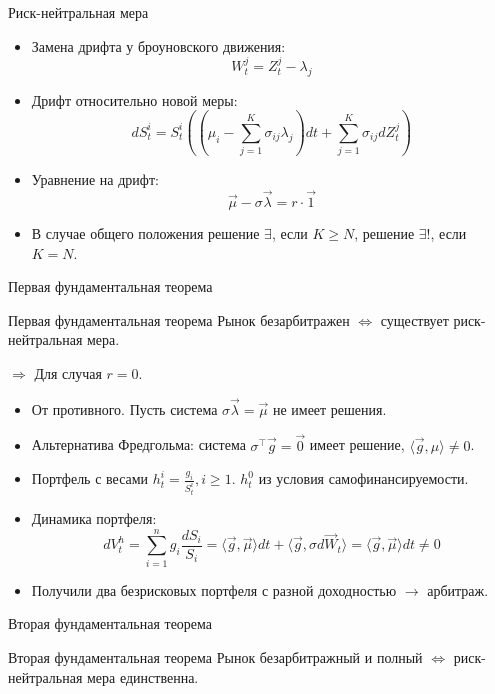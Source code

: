 \documentclass[aspectratio=169]{beamer}
\begin{document}
\begin{frame}{Риск-нейтральная мера}
    \begin{itemize}
        \item Замена дрифта у броуновского движения:
        $$
            W_t^j = Z_t^j - \lambda_j
        $$
        \item Дрифт относительно новой меры:
        $$
            dS^i_t = S^i_t \left( (\mu_i - \sum_{j=1}^K \sigma_{ij} \lambda_j) dt  + \sum_{j=1}^K \sigma_{ij} dZ_t^j \right)
        $$
        \item Уравнение на дрифт:
        $$
            \vec{\mu} - \sigma \vec{\lambda} = r \cdot \vec{1}
        $$
        \item В случае общего положения решение $\exists$, если $K \geq N$, решение $\exists!$, если $K=N$.
    \end{itemize}
\end{frame}

\begin{frame}{Первая фундаментальная теорема}
    \begin{block}{Первая фундаментальная теорема}
        Рынок безарбитражен $\Leftrightarrow$ существует риск-нейтральная мера.
    \end{block}

    $\Rightarrow$ Для случая $r=0$.
    \begin{itemize}
        \item От противного. Пусть система $\sigma \vec{\lambda} = \vec{\mu}$ не имеет решения.
        \item Альтернатива Фредгольма: система $\sigma^{\top} \vec{g} = \vec{0}$ имеет решение, $\langle \vec{g}, \mu \rangle \neq 0$.
        \item Портфель с весами $h_t^i = \frac{g_i}{S_t^i}, i \geq 1$. $h_t^0$ из условия самофинансируемости.
        \item Динамика портфеля:
        $$
            dV^h_t = \sum_{i=1}^n g_i \frac{dS_i}{S_i}
            = \langle \vec{g}, \vec{\mu} \rangle dt + 
            \langle \vec{g}, \hat{\sigma} d\vec{W}_t \rangle = 
            \langle \vec{g}, \vec{\mu} \rangle dt \neq 0
        $$ 
        \item Получили два безрисковых портфеля с разной доходностью $\to$ арбитраж.
    \end{itemize}
\end{frame}

\begin{frame}{Вторая фундаментальная теорема}
    \begin{block}{Вторая фундаментальная теорема}
        Рынок безарбитражный и полный $\Leftrightarrow$ риск-нейтральная мера единственна.
    \end{block}
\end{frame}
\end{document}
